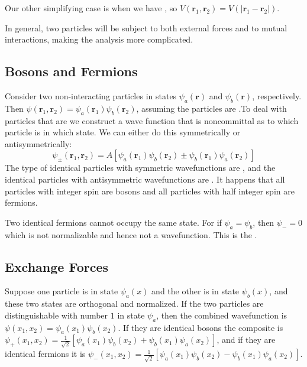 \documentclass[12pt, a4paper, oneside, openright, titlepage]{book}
\begin{document}
Our other simplifying case is when we have , so $V(\mathbf{r}_1,\mathbf{r}_2) = V(|\mathbf{r}_1 -\mathbf{r}_2|)$.

In general, two particles will be subject to both external forces and to mutual interactions, making the analysis more complicated.

\subsection{Bosons and Fermions}

Consider two non-interacting particles in states $\psi_a(\mathbf{r})$ and $\psi_b(\mathbf{r})$, respectively. Then $\psi(\mathbf{r}_1,\mathbf{r}_2) = \psi_a(\mathbf{r}_1)\psi_b(\mathbf{r}_2)$, assuming the particles are .To deal with particles that are  we construct a wave function that is noncommittal as to which particle is in which state. We can either do this symmetrically or antisymmetrically: \begin{equation*}
    \psi_{\pm}(\mathbf{r}_1,\mathbf{r}_2) = A[\psi_a(\mathbf{r}_1)\psi_b(\mathbf{r}_2) \pm \psi_b(\mathbf{r}_1)\psi_a(\mathbf{r}_2)]
\end{equation*}
The type of identical particles with symmetric wavefunctions are , and the identical particles with antisymmetric wavefunctions are . It happens that all particles with integer spin are bosons and all particles with half integer spin are fermions.

\begin{cor}
    Two identical fermions cannot occupy the same state. For if $\psi_a = \psi_b$, then $\psi_- = 0$ which is not normalizable and hence not a wavefunction. This is the .
\end{cor}

\subsection{Exchange Forces}

Suppose one particle is in state $\psi_a(x)$ and the other is in state $\psi_b(x)$, and these two states are orthogonal and normalized. If the two particles are distinguishable with number $1$ in state $\psi_a$, then the combined wavefunction is $\psi(x_1,x_2) = \psi_a(x_1)\psi_b(x_2)$. If they are identical bosons the composite is $\psi_+(x_1,x_2) = \frac{1}{\sqrt{2}}[\psi_a(x_1)\psi_b(x_2)+\psi_b(x_1)\psi_a(x_2)]$, and if they are identical fermions it is $\psi_-(x_1,x_2) = \frac{1}{\sqrt{2}}[\psi_a(x_1)\psi_b(x_2)-\psi_b(x_1)\psi_a(x_2)]$.
\end{document}
